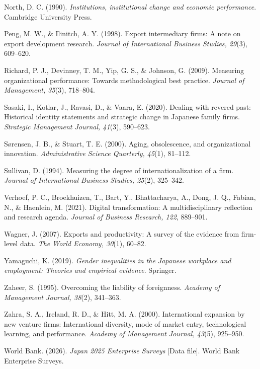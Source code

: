 \documentclass[
  12pt,a4paper]{article}
\begin{document}
North, D. C. (1990). \emph{Institutions, institutional change and
economic performance}. Cambridge University Press.

Peng, M. W., \& Ilinitch, A. Y. (1998). Export intermediary firms: A
note on export development research. \emph{Journal of International
Business Studies, 29}(3), 609--620.

Richard, P. J., Devinney, T. M., Yip, G. S., \& Johnson, G. (2009).
Measuring organizational performance: Towards methodological best
practice. \emph{Journal of Management, 35}(3), 718--804.

Sasaki, I., Kotlar, J., Ravasi, D., \& Vaara, E. (2020). Dealing with
revered past: Historical identity statements and strategic change in
Japanese family firms. \emph{Strategic Management Journal, 41}(3),
590--623.

Sørensen, J. B., \& Stuart, T. E. (2000). Aging, obsolescence, and
organizational innovation. \emph{Administrative Science Quarterly,
45}(1), 81--112.

Sullivan, D. (1994). Measuring the degree of internationalization of a
firm. \emph{Journal of International Business Studies, 25}(2), 325--342.

Verhoef, P. C., Broekhuizen, T., Bart, Y., Bhattacharya, A., Dong, J.
Q., Fabian, N., \& Haenlein, M. (2021). Digital transformation: A
multidisciplinary reflection and research agenda. \emph{Journal of
Business Research, 122}, 889--901.

Wagner, J. (2007). Exports and productivity: A survey of the evidence
from firm-level data. \emph{The World Economy, 30}(1), 60--82.

Yamaguchi, K. (2019). \emph{Gender inequalities in the Japanese
workplace and employment: Theories and empirical evidence}. Springer.

Zaheer, S. (1995). Overcoming the liability of foreignness.
\emph{Academy of Management Journal, 38}(2), 341--363.

Zahra, S. A., Ireland, R. D., \& Hitt, M. A. (2000). International
expansion by new venture firms: International diversity, mode of market
entry, technological learning, and performance. \emph{Academy of
Management Journal, 43}(5), 925--950.

World Bank. (2026). \emph{Japan 2025 Enterprise Surveys} {[}Data
file{]}. World Bank Enterprise Surveys.
\end{document}

